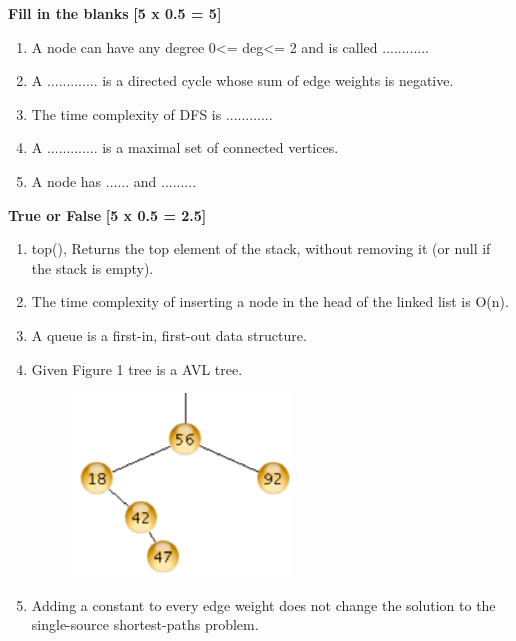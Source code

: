 \documentclass[12pt ,a4paper]{exam}
\begin{document}
	\noindent \textbf{Fill in the blanks} \hfill\textbf{ [5 x 0.5 = 5]}
	
	\begin{enumerate}[start=11,label={\bfseries Q\arabic*)}]
		\item A node can have any degree 0<= deg<= 2 and is called ............
		\item A ............. is a directed cycle whose sum of edge weights is negative.
		\item The time complexity of DFS is ............
		\item A .............  is a maximal set of connected vertices.	
		\item A node has ...... and  .........
\end{enumerate}
	
	\vspace{0.1mm}
	  \noindent \textbf{True or False} \hfill\textbf{ [5 x 0.5 = 2.5]}
	
	\begin{enumerate}[start=16,label={\bfseries Q\arabic*)}]
		\item top(), Returns the top element of the stack, without removing it (or null if the stack is empty).
		\item The time complexity of inserting a node in the head of the linked list is O(n).
		\item A queue is a first-in, first-out data structure.
		\item Given Figure 1 tree is a AVL tree.
		\begin{figure}[h]
			\centering
			\includegraphics[width=0.4\linewidth]{"Screenshot 2020-12-27 at 1.12.12 PM"}
			\caption{}
			\label{fig:screenshot-2020-12-27-at-1}
		\end{figure}
	   \item Adding a constant to every edge weight does not change the solution to the single-source shortest-paths problem.
		
	\end{enumerate}
	
\end{document}
